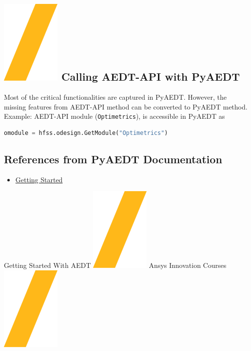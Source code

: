 \documentclass[9pt,landscape]{article}
\begin{document}
\begin{multicols}{3}
\section{\includegraphics[height=\fontcharht\font`\S]{slash.png} Calling AEDT-API with PyAEDT}
Most of the critical functionalities are captured in PyAEDT. However, the missing features from AEDT-API method can be converted to PyAEDT method.
\newline
\\
Example: AEDT-API module (\texttt{Optimetrics}), is accessible in PyAEDT as
\begin{lstlisting}[language=Python]
omodule = hfss.odesign.GetModule("Optimetrics")
\end{lstlisting}

\subsection{References from PyAEDT Documentation}
\begin{itemize}
\item \href{https://aedt.docs.pyansys.com}{Getting Started}
\end{itemize}
\end{multicols}
\vspace{-0.5cm}
\noindent\makebox[\linewidth]{\rule{\paperwidth}{4pt}}
\begin{center}
Getting Started With AEDT \includegraphics[height=\fontcharht\font`\S]{slash.png} Ansys Innovation Courses \includegraphics[height=\fontcharht\font`\S]{slash.png} %
\end{center}
\end{document}
